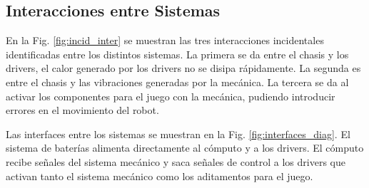 \subsection{Interacciones entre Sistemas}
En la Fig. \ref{fig:incid_inter} se muestran las tres interacciones incidentales identificadas entre los distintos sistemas. La primera se da entre el chasis y los drivers, el calor generado por los drivers no se disipa rápidamente. La segunda es entre el chasis y las vibraciones generadas por la mecánica. La tercera se da al activar los componentes para el juego con la mecánica, pudiendo introducir errores en el movimiento del robot. 

Las interfaces entre los sistemas se muestran en la Fig. \ref{fig:interfaces_diag}. El sistema de baterías alimenta directamente al cómputo y a los drivers. El cómputo recibe señales del sistema mecánico y saca señales de control a los drivers que activan tanto el sistema mecánico como los aditamentos para el juego.
